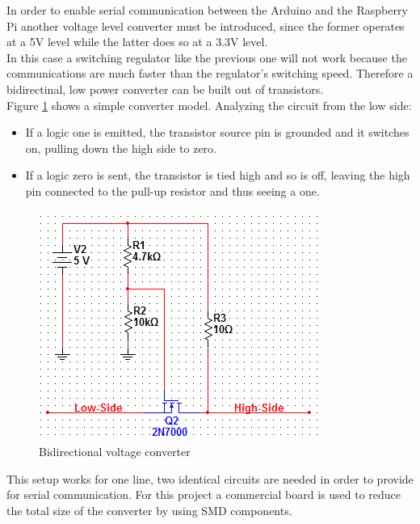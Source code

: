 		In order to enable serial communication between the Arduino and the Raspberry Pi another voltage level converter must be introduced, since the former operates at a 5V level while the latter does so at a 3.3V level.\\

		In this case a switching regulator like the previous one will not work because the communications are much faster than the regulator's switching speed. Therefore a bidirectinal, low power converter can be built out of transistors.\\

		Figure \ref{figure:levelShifter} shows a simple converter model.
		Analyzing the circuit from the low side: 
			\begin{itemize}
			\item If a logic one is emitted, the transistor source pin is grounded and it switches on, pulling down the high side to zero.
			\item If a logic zero is sent, the transistor is tied high and so is off, leaving the high pin connected to the pull-up resistor and thus seeing a one.
			\end{itemize}

			\begin{figure}[H]
					\centering
					\includegraphics[scale=0.8]{images/ProjectComponents/level-converter-circuit.png}
					\caption{Bidirectional voltage converter}
					\label{figure:levelShifter}
			\end{figure}
			\bigskip

			This setup works for one line, two identical circuits are needed in order to provide for serial communication. For this project a commercial board is used to reduce the total size of the converter by using SMD components.

